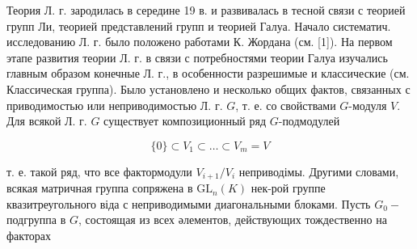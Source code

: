 \documentclass[10pt]{article}
\begin{document}
Теория Л. г. зародилась в середине 19 в. и развивалась в тесной связи с теорией групп Ли, теорией представлений групп и теорией Галуа. Начало систематич. исследованию Л. г. было положено работами К. Жордана (см. [1]). На первом этапе развития теории Л. г. в связи с потребностями теории Галуа изучались главным образом конечные Л. г., в особенности разрешимые и классические (см. Классическая группа). Было установлено и несколько общих фактов, связанных с приводимостью или неприводимостью Л. г. $G$, т. е. со свойствами $G$-модуля $V$. Для всякой Л. г. $G$ существует композиционный ряд $G$-подмодулей



\[

\{0\} \subset V_{1} \subset \ldots \subset V_{m}=V

\]



т. е. такой ряд, что все фактормодули $V_{i+1} / V_{i}$ неприводімы. Другими словами, всякая матричная группа сопряжена в $\mathrm{GL}_{n}(K)$ нек-рой группе квазитреугольного віда с неприводимыми диагональными блоками. Пусть $G_{0}-$ подгруппа в $G$, состоящая из всех әлементов, действующих тождественно на факторах
\end{document}
